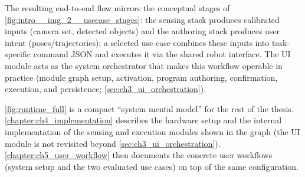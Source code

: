 The resulting end-to-end flow mirrors the conceptual stages of \autoref{fig:intro__img_2__usecase_stages}:
the sensing stack produces calibrated inputs (camera set, detected objects) and the authoring stack produces user intent (poses/trajectories);
a selected use case combines these inputs into task-specific command JSON and executes it via the shared robot interface.
The UI module acts as the system orchestrator that makes this workflow operable in practice (module graph setup, activation, program authoring, confirmation, execution, and persistence; \autoref{sec:ch3_ui_orchestration}).


\autoref{fig:runtime_full} is a compact ``system mental model'' for the rest of the thesis.
\autoref{chapter:ch4_implementation} describes the hardware setup and the internal implementation of the sensing and execution modules shown in the graph (the UI module is not revisited beyond \autoref{sec:ch3_ui_orchestration}).
\autoref{chapter:ch5_user_workflow} then documents the concrete user workflows (system setup and the two evaluated use cases) on top of the same configuration.











